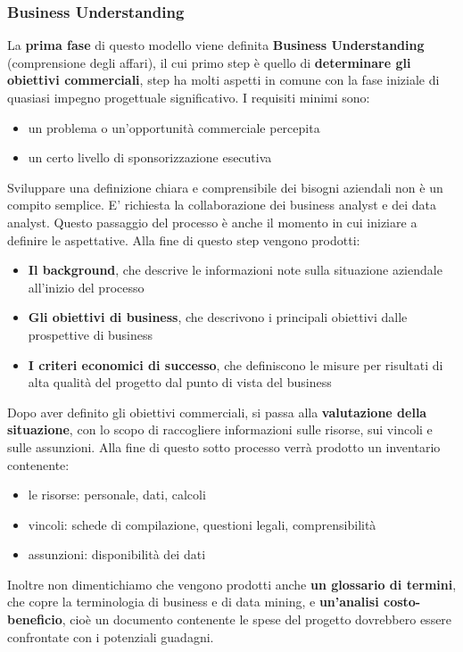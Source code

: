 \documentclass[a4paper]{extarticle}
\begin{document}
\subsubsection{Business Understanding}
La \textbf{prima fase} di questo modello viene definita \textbf{Business Understanding} (comprensione degli affari), il cui primo step è quello di \textbf{determinare gli obiettivi commerciali}, step ha molti aspetti in comune con la fase iniziale di quasiasi impegno progettuale significativo. I requisiti minimi sono:
\begin{itemize}
	\item un problema o un'opportunità commerciale percepita
	\item un certo livello di sponsorizzazione esecutiva
\end{itemize}
Sviluppare una definizione chiara e comprensibile dei bisogni aziendali non è un compito semplice. E' richiesta la collaborazione dei business analyst e dei data analyst. Questo passaggio del processo è anche il momento in cui iniziare a definire le aspettative. Alla fine di questo step vengono prodotti:
\begin{itemize}
	\item \textbf{Il background}, che descrive le informazioni note sulla situazione aziendale all'inizio del processo
	\item \textbf{Gli obiettivi di business}, che descrivono i principali obiettivi dalle prospettive di business
	\item \textbf{I criteri economici di successo}, che definiscono le misure per risultati di alta qualità del progetto dal punto di vista del business
\end{itemize}

Dopo aver definito gli obiettivi commerciali, si passa alla \textbf{valutazione della situazione}, con lo scopo di raccogliere informazioni sulle risorse, sui vincoli e sulle assunzioni. Alla fine di questo sotto processo verrà prodotto un inventario contenente:
\begin{itemize}
\item le risorse: personale, dati, calcoli
\item vincoli: schede di compilazione, questioni legali, comprensibilità
\item assunzioni: disponibilità dei dati
\end{itemize}

Inoltre non dimentichiamo che vengono prodotti anche \textbf{un glossario di termini}, che copre la terminologia di business e di data mining, e \textbf{un'analisi costo-beneficio}, cioè un documento contenente le spese del progetto dovrebbero essere confrontate con i potenziali guadagni.
\end{document}
